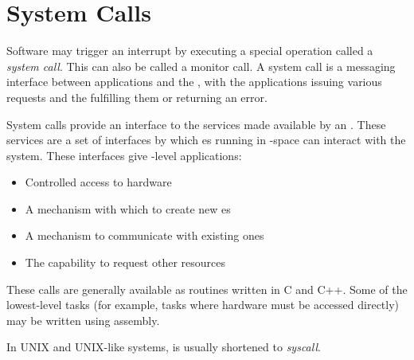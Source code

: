 \section{System Calls}\label{sec:System_Calls}
\begin{definition}\label{def:System_Call}
  Software may trigger an interrupt by executing a special operation called a \emph{system call}.
  This can also be called a monitor call.
  A system call is a messaging interface between applications and the , with the applications issuing various requests and the  fulfilling them or returning an error.

  System calls provide an interface to the services made available by an .
  These services are a set of interfaces by which es running in -space can interact with the system.
  These interfaces give -level applications:
  \begin{itemize}[noitemsep]
  \item Controlled access to hardware
  \item A mechanism with which to create new es
  \item A mechanism to communicate with existing ones
  \item The capability to request other  resources
  \end{itemize}

  These calls are generally available as routines written in C and C++.
  Some of the lowest-level tasks (for example, tasks where hardware must be accessed directly) may be written using assembly.

  \begin{remark}[Syscall]\label{rmk:Syscall}
    In UNIX and UNIX-like systems,  is usually shortened to \emph{syscall}.
  \end{remark}
\end{definition}

